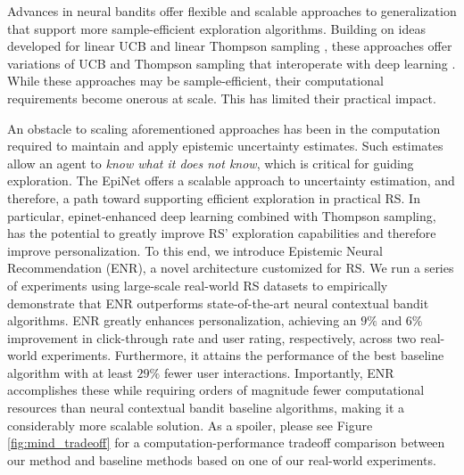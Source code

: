 Advances in neural bandits offer flexible and scalable approaches to generalization that support more sample-efficient exploration algorithms.  Building on ideas developed for linear UCB and linear Thompson sampling \cite{li2010contextual, chapelle2011empirical}, these approaches offer variations of UCB and Thompson sampling that interoperate with deep learning \cite{li2010contextual, zhou2020neural, xu2021neural,abeille2017linear, zhang2021neural, lu2017ensemble,dwaracherla2019hypermodels,OsbandNeuralTestbed,QinEnsembleSampling}.  While these approaches may be sample-efficient, their computational requirements become onerous at scale.  This has limited their practical impact.

An obstacle to scaling aforementioned approaches has been in the computation required to maintain and apply epistemic uncertainty estimates.  Such estimates allow an agent to {\it know what it does not know}, which is critical for guiding exploration.  The EpiNet \cite{osband2021epistemic} offers a scalable approach to uncertainty estimation, and therefore, a path toward supporting efficient exploration in practical RS.  In particular, epinet-enhanced deep learning combined with Thompson sampling, has the potential to greatly improve RS' exploration capabilities and therefore improve personalization. To this end, we introduce Epistemic Neural Recommendation (ENR), a novel architecture customized for RS. We run a series of experiments using large-scale real-world RS datasets to empirically demonstrate that ENR outperforms state-of-the-art neural contextual bandit algorithms. ENR greatly enhances personalization, achieving an $9\%$ and $6\%$ improvement in click-through rate and user rating, respectively, across two real-world experiments. Furthermore, it attains the performance of the best baseline algorithm with at least $29\%$ fewer user interactions. Importantly, ENR accomplishes these while requiring orders of magnitude fewer computational resources than neural contextual bandit baseline algorithms, making it a considerably more scalable solution. As a spoiler, please see Figure \ref{fig:mind_tradeoff} for a computation-performance tradeoff comparison between our method and baseline methods based on one of our real-world experiments.



